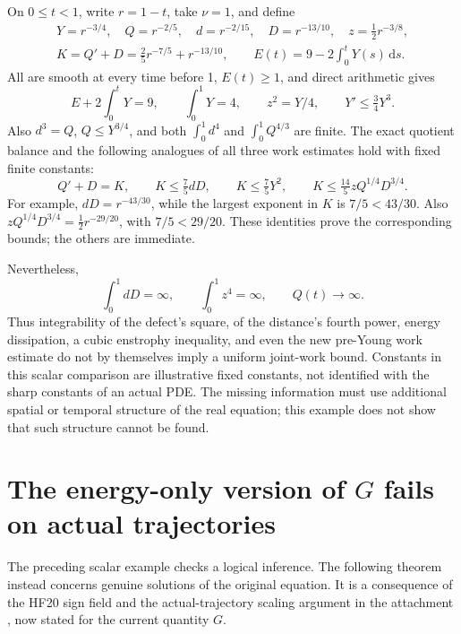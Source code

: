 \documentclass[11pt,a4paper]{article}
\theoremstyle{definition}
\theoremstyle{remark}
\newcommand{\dd}{\,\mathrm d}
\numberwithin{equation}{section}
\begin{document}
On \(0\le t<1\), write \(r=1-t\), take \(\nu=1\), and define
\begin{equation}\label{eq:scalarfamily}
\begin{split}
Y=r^{-3/4},\quad Q=r^{-2/5},\quad d=r^{-2/15},\quad
D=r^{-13/10},\quad z=\tfrac12r^{-3/8},\\
K=Q'+D=\tfrac25r^{-7/5}+r^{-13/10},\qquad
E(t)=9-2\int_0^tY(s)\dd s.
\end{split}
\end{equation}
All are smooth at every time before 1, \(E(t)\ge1\), and direct arithmetic gives
\[
E+2\int_0^tY=9,\qquad \int_0^1Y=4,\qquad z^2=Y/4,
\qquad Y'\le\tfrac34Y^3.
\]
Also \(d^3=Q\), \(Q\le Y^{3/4}\), and both \(\int_0^1d^4\) and \(\int_0^1Q^{4/3}\) are finite. The exact quotient balance and the following analogues of all three work estimates hold with fixed finite constants:
\begin{equation}\label{eq:scalarbounds}
Q'+D=K,
\qquad
K\le\tfrac75dD,
\qquad K\le\tfrac75Y^2,
\qquad K\le\tfrac{14}{5}zQ^{1/4}D^{3/4}.
\end{equation}
For example, \(dD=r^{-43/30}\), while the largest exponent in \(K\) is \(7/5<43/30\). Also
\(zQ^{1/4}D^{3/4}=\frac12r^{-29/20}\), with \(7/5<29/20\). These identities prove the corresponding bounds; the others are immediate.

Nevertheless,
\[
\int_0^1dD=\infty,\qquad \int_0^1z^4=\infty,\qquad Q(t)\longrightarrow\infty.
\]
Thus integrability of the defect's square, of the distance's fourth power, energy dissipation, a cubic enstrophy inequality, and even the new pre-Young work estimate do not by themselves imply a uniform joint-work bound. Constants in this scalar comparison are illustrative fixed constants, not identified with the sharp constants of an actual PDE. The missing information must use additional spatial or temporal structure of the real equation; this example does not show that such structure cannot be found.

\section{The energy-only version of \texorpdfstring{\(G\)}{G} fails on actual trajectories}\label{sec:actual}
The preceding scalar example checks a logical inference. The following theorem instead concerns genuine solutions of the original equation. It is a consequence of the HF20 sign field and the actual-trajectory scaling argument in the attachment \cite[Theorem 7.1]{Attachment}, now stated for the current quantity \(G\).
\end{document}
